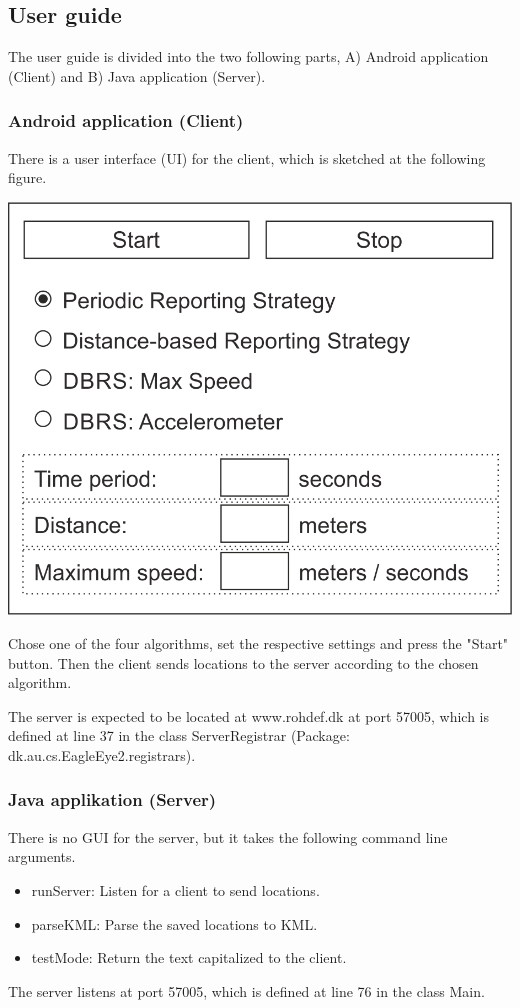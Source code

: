 \subsection{User guide}
The user guide is divided into the two following parts, A) Android application (Client) and B) Java application (Server).

\subsubsection*{Android application (Client)}
There is a user interface (UI) for the client, which is sketched at the following figure.

\includegraphics{GUI}

Chose one of the four algorithms, set the respective settings and press the "Start" button. Then the client sends locations to the server according to the chosen algorithm.

The server is expected to be located at www.rohdef.dk at port 57005, which is defined at line 37 in the class ServerRegistrar (Package: dk.au.cs.EagleEye2.registrars).

\subsubsection*{Java applikation (Server)}
There is no GUI for the server, but it takes the following command line arguments.

\begin{itemize} \itemsep1pt \parskip0pt 
  \item runServer: Listen for a client to send locations.
  \item parseKML: Parse the saved locations to KML.
  \item testMode: Return the text capitalized to the client.
\end{itemize}

The server listens at port 57005, which is defined at line 76 in the class Main.